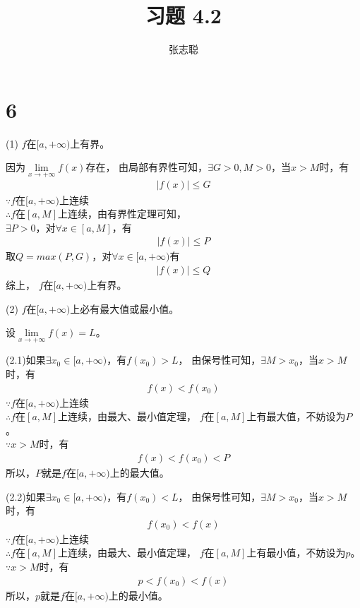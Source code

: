 \documentclass{article}
\begin{document}
\title{习题 4.2}
\author{张志聪}
\maketitle

\section*{6}

 (1) $f$在$[a, +\infty)$上有界。

因为$\lim\limits_{x \to +\infty} f(x)$存在，
由局部有界性可知，$\exists G > 0, M > 0$，当$x > M$时，有
\begin{align*}
  |f(x)| \leq G
\end{align*}
$\because f$在$[a, +\infty)$上连续 \\
$\therefore f$在$[a, M]$上连续，由有界性定理可知，\\
$\exists P > 0$，对$\forall x \in [a, M]$，有
\begin{align*}
  |f(x)| \leq P
\end{align*}
取$Q = max(P, G)$，对$\forall x \in [a, +\infty)$有
\begin{align*}
  |f(x)| \leq Q
\end{align*}
综上， $f$在$[a, +\infty)$上有界。

(2) $f$在$[a, +\infty)$上必有最大值或最小值。

设$\lim\limits_{x \to +\infty} f(x) = L$。

(2.1)如果$\exists x_0 \in [a, +\infty)$，有$f(x_0) > L $，
由保号性可知，$\exists M > x_0$，当$x > M$时，有
\begin{align*}
  f(x) < f(x_0)
\end{align*}
$\because f$在$[a, +\infty)$上连续 \\
$\therefore f$在$[a, M]$上连续，由最大、最小值定理，
$f$在$[a, M]$上有最大值，不妨设为$P$。\\
$\because x > M$时，有
\begin{align*}
  f(x) < f(x_0) < P
\end{align*}
所以，$P$就是$f$在$[a, +\infty)$上的最大值。

(2.2)如果$\exists x_0 \in [a, +\infty)$，有$f(x_0) < L $，
由保号性可知，$\exists M > x_0$，当$x > M$时，有
\begin{align*}
  f(x_0) < f(x)
\end{align*}
$\because f$在$[a, +\infty)$上连续 \\
$\therefore f$在$[a, M]$上连续，由最大、最小值定理，
$f$在$[a, M]$上有最小值，不妨设为$p$。\\
$\because x > M$时，有
\begin{align*}
  p < f(x_0) < f(x)
\end{align*}
所以，$p$就是$f$在$[a, +\infty)$上的最小值。
\end{document}
